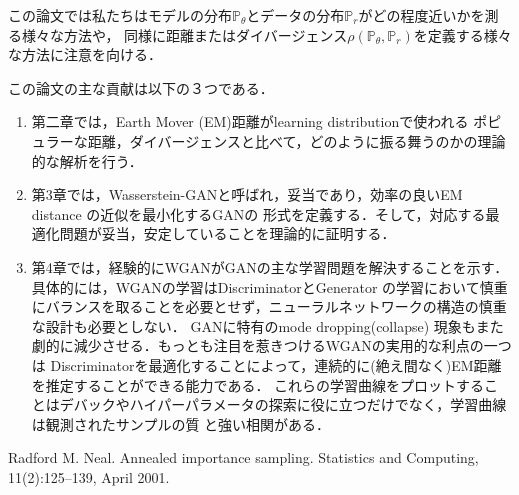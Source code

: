 \documentclass[uplatex, dvipdfmx]{jsarticle}
\theoremstyle{definition}
\begin{document}
    この論文では私たちはモデルの分布$\mathbb{P}_{\theta}$とデータの分布$\mathbb{P}_{r}$がどの程度近いかを測る様々な方法や，
    同様に距離またはダイバージェンス$\rho (\mathbb{P}_{\theta}, \mathbb{P}_{r})$を定義する様々な方法に注意を向ける．
    
    この論文の主な貢献は以下の３つである．
    \begin{enumerate}
        \item 第二章では，Earth Mover (EM)距離がlearning distributionで使われる
        ポピュラーな距離，ダイバージェンスと比べて，どのように振る舞うのかの理論的な解析を行う．
        \item 第3章では，Wasserstein-GANと呼ばれ，妥当であり，効率の良いEM distance の近似を最小化するGANの
        形式を定義する．そして，対応する最適化問題が妥当，安定していることを理論的に証明する．
        \item 第4章では，経験的にWGANがGANの主な学習問題を解決することを示す．具体的には，WGANの学習はDiscriminatorとGenerator
        の学習において慎重にバランスを取ることを必要とせず，ニューラルネットワークの構造の慎重な設計も必要としない．
        GANに特有のmode dropping(collapse) 現象もまた劇的に減少させる．もっとも注目を惹きつけるWGANの実用的な利点の一つは
        Discriminatorを最適化することによって，連続的に(絶え間なく)EM距離を推定することができる能力である．
        これらの学習曲線をプロットすることはデバックやハイパーパラメータの探索に役に立つだけでなく，学習曲線は観測されたサンプルの質
        と強い相関がある．
    \end{enumerate}

    \newpage
    \begin{thebibliography}{10}
        Radford M. Neal. Annealed importance sampling. 
        Statistics and Computing, 11(2):125–139, April 2001.
    \end{thebibliography}
    
    
\end{document}
